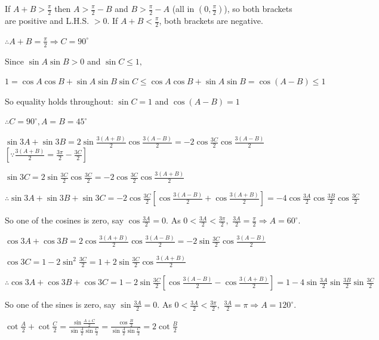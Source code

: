   If $A + B > \frac{\pi}{2}$ then $A > \frac{\pi}{2} - B$ and $B > \frac{\pi}{2} - A$ (all in $(0, \frac{\pi}{2})$),
  so both brackets are positive and L.H.S. $> 0$. If $A + B < \frac{\pi}{2}$, both brackets are negative.

  $\therefore A + B = \frac{\pi}{2} \Rightarrow C = 90^\circ$

\item Since $\sin A\sin B > 0$ and $\sin C \leq 1,$

  $1 = \cos A\cos B + \sin A\sin B\sin C \leq \cos A\cos B + \sin A\sin B = \cos(A - B) \leq 1$

  So equality holds throughout: $\sin C = 1$ and $\cos(A - B) = 1$

  $\therefore C = 90^\circ, A = B = 45^\circ$

\item $\sin 3A + \sin 3B = 2\sin\frac{3(A + B)}{2}\cos\frac{3(A - B)}{2} = -2\cos\frac{3C}{2}\cos\frac{3(A - B)}{2}$
  $\left[\because \frac{3(A + B)}{2} = \frac{3\pi}{2} - \frac{3C}{2}\right]$

  $\sin 3C = 2\sin\frac{3C}{2}\cos\frac{3C}{2} = -2\cos\frac{3C}{2}\cos\frac{3(A + B)}{2}$

  $\therefore \sin 3A + \sin 3B + \sin 3C = -2\cos\frac{3C}{2}\left[\cos\frac{3(A - B)}{2} + \cos\frac{3(A +
    B)}{2}\right] = -4\cos\frac{3A}{2}\cos\frac{3B}{2}\cos\frac{3C}{2}$

  So one of the cosines is zero, say $\cos\frac{3A}{2} = 0$. As $0 < \frac{3A}{2} < \frac{3\pi}{2},$ $\frac{3A}{2} =
  \frac{\pi}{2} \Rightarrow A = 60^\circ$.

\item $\cos 3A + \cos 3B = 2\cos\frac{3(A + B)}{2}\cos\frac{3(A - B)}{2} = -2\sin\frac{3C}{2}\cos\frac{3(A - B)}{2}$

  $\cos 3C = 1 - 2\sin^2\frac{3C}{2} = 1 + 2\sin\frac{3C}{2}\cos\frac{3(A + B)}{2}$

  $\therefore \cos 3A + \cos 3B + \cos 3C = 1 - 2\sin\frac{3C}{2}\left[\cos\frac{3(A - B)}{2} - \cos\frac{3(A +
    B)}{2}\right] = 1 - 4\sin\frac{3A}{2}\sin\frac{3B}{2}\sin\frac{3C}{2}$

  So one of the sines is zero, say $\sin\frac{3A}{2} = 0$. As $0 < \frac{3A}{2} < \frac{3\pi}{2},$ $\frac{3A}{2} = \pi
  \Rightarrow A = 120^\circ$.

\item $\cot\frac{A}{2} + \cot\frac{C}{2} = \frac{\sin\frac{A + C}{2}}{\sin\frac{A}{2}\sin\frac{C}{2}} =
  \frac{\cos\frac{B}{2}}{\sin\frac{A}{2}\sin\frac{C}{2}} = 2\cot\frac{B}{2}$

